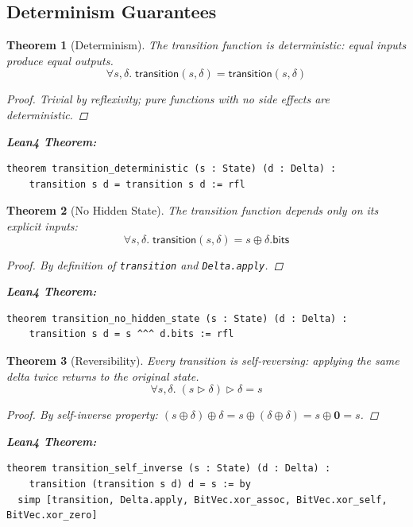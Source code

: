 \documentclass[11pt,letterpaper]{article}
\theoremstyle{plain}
\newtheorem{theorem}{Theorem}[section]
\theoremstyle{definition}
\theoremstyle{remark}
\newcommand{\dzero}{\mathbf{0}}          %
\newcommand{\transition}{\triangleright} %
\begin{document}
\subsection{Determinism Guarantees}

\begin{theorem}[Determinism]
\label{thm:determinism}
The transition function is deterministic: equal inputs produce equal outputs.
\[
\forall s, \delta.\; \mathsf{transition}(s, \delta) = \mathsf{transition}(s, \delta)
\]

\begin{proof}
Trivial by reflexivity; pure functions with no side effects are deterministic.
\end{proof}

\medskip
\noindent\textbf{Lean4 Theorem:}
\begin{lstlisting}
theorem transition_deterministic (s : State) (d : Delta) :
    transition s d = transition s d := rfl
\end{lstlisting}
\end{theorem}

\begin{theorem}[No Hidden State]
\label{thm:no-hidden}
The transition function depends only on its explicit inputs:
\[
\forall s, \delta.\; \mathsf{transition}(s, \delta) = s \oplus \delta.\mathsf{bits}
\]

\begin{proof}
By definition of \texttt{transition} and \texttt{Delta.apply}.
\end{proof}

\medskip
\noindent\textbf{Lean4 Theorem:}
\begin{lstlisting}
theorem transition_no_hidden_state (s : State) (d : Delta) :
    transition s d = s ^^^ d.bits := rfl
\end{lstlisting}
\end{theorem}

\begin{theorem}[Reversibility]
\label{thm:reversibility}
Every transition is self-reversing: applying the same delta twice returns to the original state.
\[
\forall s, \delta.\; (s \transition \delta) \transition \delta = s
\]

\begin{proof}
By self-inverse property: $(s \oplus \delta) \oplus \delta = s \oplus (\delta \oplus \delta) = s \oplus \dzero = s$.
\end{proof}

\medskip
\noindent\textbf{Lean4 Theorem:}
\begin{lstlisting}
theorem transition_self_inverse (s : State) (d : Delta) :
    transition (transition s d) d = s := by
  simp [transition, Delta.apply, BitVec.xor_assoc, BitVec.xor_self, BitVec.xor_zero]
\end{lstlisting}
\end{theorem}
\end{document}

